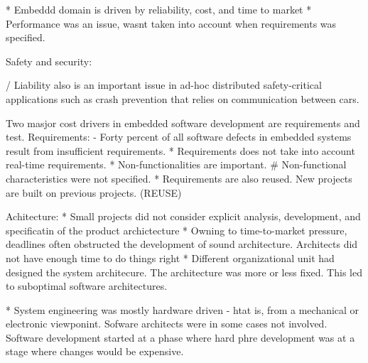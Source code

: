 * Embeddd domain is driven by reliability, cost, and time to market\cite{graaf2003embedded}
* Performance was an issue, wasnt taken into account when requirements was specified. \cite{graaf2003embedded}




















Safety and security: 

/ Liability also is an important issue in ad-hoc distributed safety-critical applications such as crash prevention that relies on communication between cars. \cite{pretschner2007software}



Two masjor cost drivers in embedded software development are requirements and test.
Requirements:
- Forty percent of all software defects in embedded systems result from insufficient requirements. \cite{ebert2009embedded}
* Requirements does not take into account real-time requirements.\cite{graaf2003embedded}
* Non-functionalities are important.\cite{graaf2003embedded}
# Non-functional characteristics were not specified. \cite{washizaki2007quality}
* Requirements are also reused. New projects are built on previous projects. (REUSE)\cite{graaf2003embedded}







Achitecture:
* Small projects did not consider explicit analysis, development, and specificatin of the product archictecture\cite{graaf2003embedded}
* Owning to time-to-market pressure, deadlines often obstructed the development of sound architecture. Architects did not have enough time to do things right\cite{graaf2003embedded}
* Different organizational unit had designed the system architecure. The architecture was more or less fixed. This led to suboptimal software architectures. \cite{graaf2003embedded}

* System engineering was mostly hardware driven - htat is, from a mechanical or electronic viewponint. Sofware architects were in some cases not involved. Software development started at a phase where hard phre development was at a stage where changes would be expensive.\cite{graaf2003embedded}








